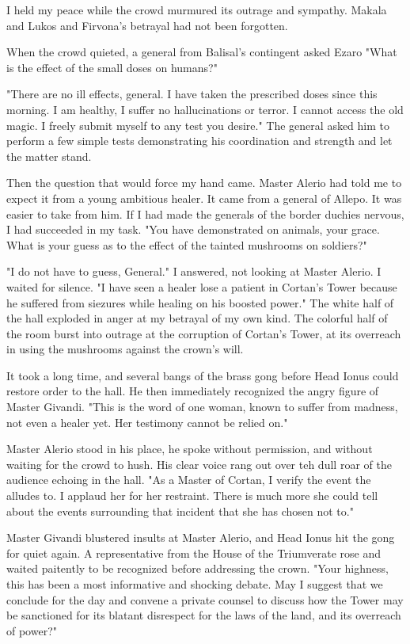 \documentclass{article}
\begin{document}
I held my peace while the crowd murmured its outrage and sympathy. Makala and Lukos and Firvona's betrayal had not been forgotten. 

When the crowd quieted, a general from Balisal's contingent asked Ezaro "What is the effect of the small doses on humans?"

"There are no ill effects, general. I have taken the prescribed doses since this morning. I am healthy, I suffer no hallucinations or terror. I cannot access the old magic. I freely submit myself to any test you desire." The general asked him to perform a few simple tests demonstrating his coordination and strength and let the matter stand. 

Then the question that would force my hand came. Master Alerio had told me to expect it from a young ambitious healer. It came from a general of Allepo. It was easier to take from him. If I had made the generals of the border duchies nervous, I had succeeded in my task. "You have demonstrated on animals, your grace. What is your guess as to the effect of the tainted mushrooms on soldiers?"

"I do not have to guess, General." I answered, not looking at Master Alerio. I waited for silence.  "I have seen a healer lose a patient in Cortan's Tower because he suffered from siezures while healing on his boosted power." The white half of the hall exploded in anger at my betrayal of my own kind. The colorful half of the room burst into outrage at the corruption of Cortan's Tower, at its overreach in using the mushrooms against the crown's will. 

It took a long time, and several bangs of the brass gong before Head Ionus could restore order to the hall. He then immediately recognized the angry figure of Master Givandi. "This is the word of one woman, known to suffer from madness, not even a healer yet. Her testimony cannot be relied on."

Master Alerio stood in his place, he spoke without permission, and without waiting for the crowd to hush. His clear voice rang out over teh dull roar of the audience echoing in the hall. "As a Master of Cortan, I verify the event the alludes to. I applaud her for her restraint. There is much more she could tell about the events surrounding that incident that she has chosen not to." 

Master Givandi blustered insults at Master Alerio, and Head Ionus hit the gong for quiet again. A representative from the House of the Triumverate rose and waited paitently to be recognized before addressing the crown. "Your highness, this has been a most informative and shocking debate. May I suggest that we conclude for the day and convene a private counsel to discuss how the Tower may be sanctioned for its blatant disrespect for the laws of the land, and its overreach of power?"
\end{document}
